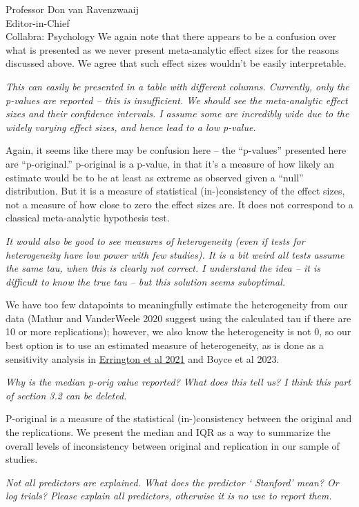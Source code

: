 \documentclass{stanfordletter}
\newcounter{section}
\newcommand{\theysaid}[1]{\begin{leftbar} \noindent 
		\textsl{ #1}\end{leftbar}}
\begin{document}
\begin{letter}{Professor Don van Ravenzwaaij \\ Editor-in-Chief \\ Collabra: Psychology }
	We again note that there appears to be a confusion over what is presented as we never present meta-analytic effect sizes for the reasons discussed above. We agree that such effect sizes wouldn't be easily interpretable. 
	
	\theysaid{This can easily be presented in a table with different columns. Currently, only the p-values are reported – this is insufficient. We should see the meta-analytic effect sizes and their confidence intervals. I assume some are incredibly wide due to the widely varying effect sizes, and hence lead to a low p-value.}
	
	Again, it seems like there may be confusion here -- the ``p-values'' presented here are ``p-original.'' p-original is a p-value, in that it's a measure of how likely an estimate would be to be at least as extreme as observed given a ``null'' distribution. But it is a measure of statistical (in-)consistency of the effect sizes, not a measure of how close to zero the effect sizes are. It does not correspond to a classical meta-analytic hypothesis test.
	
	
	\theysaid{It would also be good to see measures of heterogeneity (even if tests for heterogeneity have low power with few studies). It is a bit weird all tests assume the same tau, when this is clearly not correct. I understand the idea – it is difficult to know the true tau – but this solution seems suboptimal.}
	
	We have too few datapoints to meaningfully estimate the heterogeneity from our data (Mathur and VanderWeele 2020 suggest using the calculated tau if there are 10 or more replications); however, we also know the heterogeneity is not 0, so our best option is to use an estimated measure of heterogeneity, as is done as a sensitivity analysis in \href{https://elifesciences.org/articles/71601}{Errington et al 2021} and Boyce et al 2023. 
	
	\theysaid{Why is the median p-orig value reported? What does this tell us? I think this part of section 3.2 can be deleted.}
	
	P-original is a measure of the statistical (in-)consistency between the original and the replications. We present the median and IQR as a way to summarize the overall levels of inconsistency between original and replication in our sample of studies. 
	
	\theysaid{Not all predictors are explained. What does the predictor ‘ Stanford’ mean? Or log trials? Please explain all predictors, otherwise it is no use to report them.}
	

\end{letter}
\end{document}

